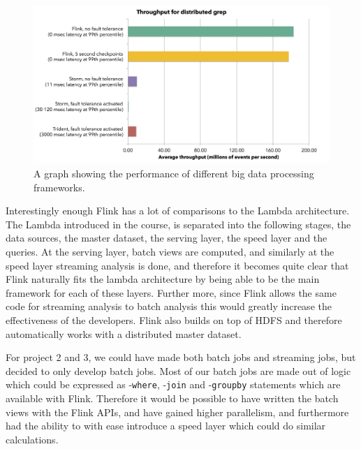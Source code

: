 \begin{figure}[H]
	\includegraphics[width=\linewidth]{figures/flink_throughput.png}
	\caption{A graph showing the performance of different big data processing frameworks.}
	\label{fig:flink_bench}
\end{figure}

\newpar Interestingly enough Flink has a lot of comparisons to the Lambda architecture. The Lambda introduced in the course, is separated into the following stages, the data sources, the master dataset, the serving layer, the speed layer and the queries. At the serving layer, batch views are computed, and similarly at the speed layer streaming analysis is done, and therefore it becomes quite clear that Flink naturally fits the lambda architecture by being able to be the main framework for each of these layers. Further more, since Flink allows the same code for streaming analysis to batch analysis this would greatly increase the effectiveness of the developers. Flink also builds on top of HDFS and therefore automatically works with a distributed master dataset.

\newpar For project 2 and 3, we could have made both batch jobs and streaming jobs, but decided to only develop batch jobs. Most of our batch jobs are made out of logic which could be expressed as -\texttt{where}, -\texttt{join} and -\texttt{groupby} statements which are available with Flink. Therefore it would be possible to have written the batch views with the Flink APIs, and have gained higher parallelism, and furthermore had the ability to with ease introduce a speed layer which could do similar calculations. 

\cite{official-flink}
\cite{data-artisan-flink}
\cite{confluent-flink}
